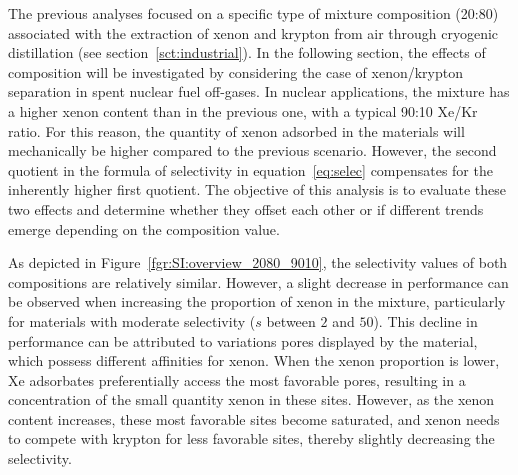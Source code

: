 \documentclass[main.tex]{subfiles}
\begin{document}
The previous analyses focused on a specific type of mixture composition (20:80) associated with the extraction of xenon and krypton from air through cryogenic distillation (see section~\ref{sct:industrial}). In the following section, the effects of composition will be investigated by considering the case of xenon/krypton separation in spent nuclear fuel off-gases. In nuclear applications, the mixture has a higher xenon content than in the previous one, with a typical 90:10 Xe/Kr ratio. For this reason, the quantity of xenon adsorbed in the materials will mechanically be higher compared to the previous scenario. However, the second quotient in the formula of selectivity in equation~\ref{eq:selec} compensates for the inherently higher first quotient. The objective of this analysis is to evaluate these two effects and determine whether they offset each other or if different trends emerge depending on the composition value. 

As depicted in Figure~\ref{fgr:SI:overview_2080_9010}, the selectivity values of both compositions are relatively similar. However, a slight decrease in performance can be observed when increasing the proportion of xenon in the mixture, particularly for materials with moderate selectivity ($s$ between $2$ and $50$). This decline in performance can be attributed to variations pores displayed by the material, which possess different affinities for xenon. When the xenon proportion is lower, Xe adsorbates preferentially access the most favorable pores, resulting in a concentration of the small quantity xenon in these sites. However, as the xenon content increases, these most favorable sites become saturated, and xenon needs to compete with krypton for less favorable sites, thereby slightly decreasing the selectivity.
\end{document}
